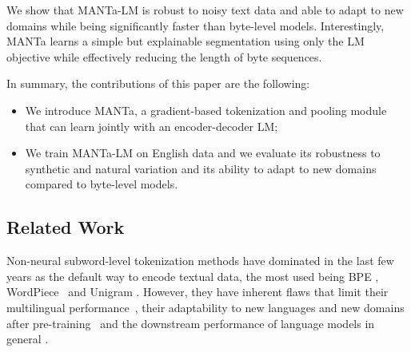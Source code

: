 We show that MANTa-LM is robust to noisy text data and able to adapt to new domains while being significantly faster than byte-level models. Interestingly, MANTa learns a simple but explainable segmentation using only the LM objective while effectively reducing the length of byte sequences.

In summary, the contributions of this paper are the following: 
\begin{itemize}
    \item We introduce MANTa, a gradient-based tokenization and pooling module that can learn jointly with an encoder-decoder LM;
    \item We train MANTa-LM on English data and we evaluate its robustness to synthetic and natural variation and its ability to adapt to new domains compared to byte-level models.
\end{itemize}


\subsection{Related Work}
Non-neural subword-level tokenization methods have dominated in the last few years as the default way to encode textual data, the most used being BPE \citep{sennrich-etal-2016-neural}, WordPiece~\cite{wu2016google} and Unigram \citep{kudo-2018-subword}. However, they have inherent flaws that limit their multilingual performance~\citep{rust-etal-2021-good}, their adaptability to new languages and new domains after pre-training~\citep{el-boukkouri-etal-2020-characterbert,garcia-etal-2021-towards} and the downstream performance of language models in general \citep{bostrom-durrett-2020-byte}.



